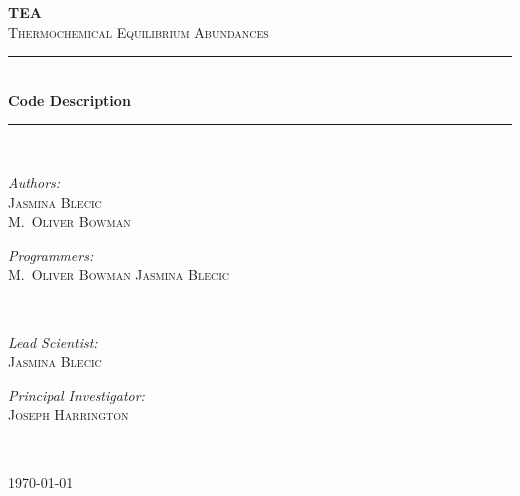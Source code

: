 


\usepackage{epsfig}
\textwidth=6.5in
\textheight=9.5in
\topmargin=-0.75in
\oddsidemargin=0.0in
\evensidemargin=0.0in

\pagestyle{myheadings}



  


\begin{titlepage}
\begin{center}

\textsc{\huge \bfseries TEA}\\[0.5cm]
\textsc{\LARGE Thermochemical Equilibrium Abundances}\\[0.5cm]
\rule{250pt}{0.4pt} \\[0.4cm]
{ \huge \bfseries Code Description\\[0.4cm] }

\rule{250pt}{0.4pt} \\[1cm]

\begin{minipage}{0.4\textwidth}
\begin{flushleft} \large
\emph{Authors:}\\
 \textsc{Jasmina Blecic \\M.~Oliver Bowman}
\end{flushleft}
\end{minipage}
\begin{minipage}{0.4\textwidth}
\begin{flushright} \large
\emph{Programmers: } \\
\textsc{M.~Oliver Bowman Jasmina Blecic }
\end{flushright}
\end{minipage}\\[1.5cm]


\begin{minipage}{0.4\textwidth}
\begin{flushleft} \large
\emph{Lead Scientist:}\\
 \textsc{Jasmina Blecic}
\end{flushleft}
\end{minipage}
\begin{minipage}{0.4\textwidth}
\begin{flushright} \large
\emph{Principal Investigator:} \\
\textsc{Joseph Harrington}
\end{flushright}
\end{minipage}\\[.5cm]

\vfill

{\large \today}

\end{center}
\end{titlepage}


